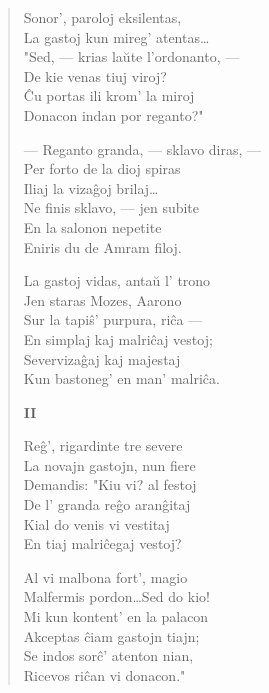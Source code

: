 \begin{verse}
                     Sonor', paroloj eksilentas,\\
                     La gastoj kun mireg' atentas\dots\\
                     "Sed, --- krias la\u ute l'ordonanto, ---\\
                     De kie venas tiuj viroj?\\
                     \^Cu portas ili krom' la miroj\\
                     Donacon indan por reganto?"

                     --- Reganto granda, --- sklavo diras, ---\\
                     Per forto de la dioj spiras\\
                     Iliaj la viza\^goj brilaj\dots\\
                     Ne finis sklavo, --- jen subite\\
                     En la salonon nepetite\\
                     Eniris du de Amram filoj.

                     La gastoj vidas, anta\u u l' trono\\
                     Jen staras Mozes, Aarono\\
                     Sur la tapi\^s' purpura, ri\^ca ---\\
                     En simplaj kaj malri\^caj vestoj;\\
                     Severviza\^gaj kaj majestaj\\
                     Kun bastoneg' en man' malri\^ca.

\begin{center}
\textbf{II}
\end{center}

                     Re\^g', rigardinte tre severe\\
                     La novajn gastojn, nun fiere\\
                     Demandis: "Kiu vi? al festoj\\
                     De l' granda re\^go aran\^gitaj\\
                     Kial do venis vi vestitaj\\
                     En tiaj malri\^cegaj vestoj?

                     Al vi malbona fort', magio\\
                     Malfermis pordon\dots Sed do kio!\\
                     Mi kun kontent' en la palacon\\
                     Akceptas \^ciam gastojn tiajn;\\
                     Se indos sor\^c' atenton nian,\\
                     Ricevos ri\^can vi donacon."


\end{verse}
